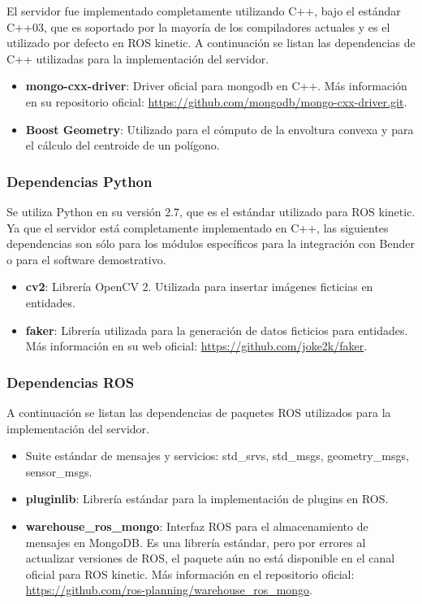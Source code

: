 El servidor fue implementado completamente utilizando C++, bajo el estándar C++03, que es soportado por la mayoría de los compiladores actuales y es el utilizado por defecto en ROS kinetic. A continuación se listan las dependencias de C++ utilizadas para la implementación del servidor.

\begin{itemize}
	\item {\bfseries mongo-cxx-driver}: Driver oficial para mongodb en C++. Más información en su repositorio oficial: \url{https://github.com/mongodb/mongo-cxx-driver.git}. 
	\item {\bfseries Boost Geometry}: Utilizado para el cómputo de la envoltura convexa y para el cálculo del centroide de un polígono.
\end{itemize}


\subsubsection{Dependencias Python}

Se utiliza Python en su versión 2.7, que es el estándar utilizado para ROS kinetic. Ya que el servidor está completamente implementado en C++, las siguientes dependencias son sólo para los módulos específicos para la integración con Bender o para el software demostrativo.

\begin{itemize}
\item {\bfseries cv2}: Librería OpenCV 2. Utilizada para insertar imágenes ficticias en entidades. 
\item {\bfseries faker}: Librería utilizada para la generación de datos ficticios para entidades. Más información en su web oficial: \url{https://github.com/joke2k/faker}.
\end{itemize}


\subsubsection{Dependencias ROS}

A continuación se listan las dependencias de paquetes ROS utilizados para la implementación del servidor.
\begin{itemize}
	\item Suite estándar de mensajes y servicios: std\_srvs, std\_msgs, geometry\_msgs, sensor\_msgs.
	\item {\bfseries pluginlib}: Librería estándar para la implementación de plugins en ROS.
	\item {\bfseries warehouse\_ros\_mongo}: Interfaz ROS para el almacenamiento de mensajes en MongoDB. Es una librería estándar, pero por errores al actualizar versiones de ROS, el paquete aún no está disponible en el canal oficial para ROS kinetic. Más información en el repositorio oficial: \url{https://github.com/ros-planning/warehouse\_ros\_mongo}.
\end{itemize}

